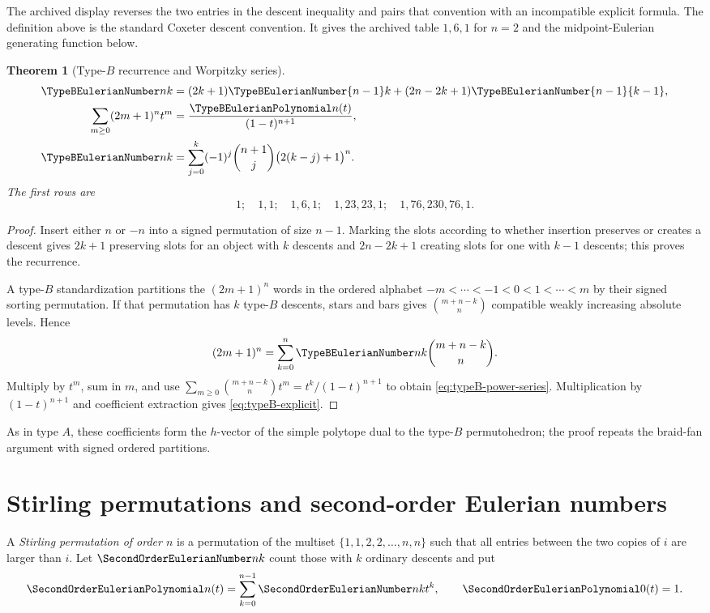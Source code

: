 \documentclass[11pt,a4paper,oneside,openany]{book}
\newtheorem{theorem}{Theorem}[chapter]
\theoremstyle{definition}
\theoremstyle{remark}
\begin{document}
\begin{auditbox}
The archived display reverses the two entries in the descent inequality and pairs
that convention with an incompatible explicit formula.  The definition above is
the standard Coxeter descent convention.  It gives the archived table
$1,6,1$ for $n=2$ and the midpoint-Eulerian generating function below.
\end{auditbox}

\begin{theorem}[Type-$B$ recurrence and Worpitzky series]\label{thm:typeB-eulerian}
\begin{align}
 \TypeBEulerianNumber nk&=(2k+1)\TypeBEulerianNumber{n-1}k+(2n-2k+1)\TypeBEulerianNumber{n-1}{k-1},
 \label{eq:typeB-recurrence}\\
 \sum_{m\ge0}(2m+1)^nt^m&=\frac{\TypeBEulerianPolynomial n(t)}{(1-t)^{n+1}},
 \label{eq:typeB-power-series}\\
 \TypeBEulerianNumber nk&=\sum_{j=0}^{k}(-1)^j\binom{n+1}{j}
             \bigl(2(k-j)+1\bigr)^n.
 \label{eq:typeB-explicit}
\end{align}
The first rows are
\[
1;\quad 1,1;\quad1,6,1;\quad1,23,23,1;\quad1,76,230,76,1.
\]
\end{theorem}
\begin{proof}
Insert either $n$ or $-n$ into a signed permutation of size $n-1$.  Marking the
slots according to whether insertion preserves or creates a descent gives
$2k+1$ preserving slots for an object with $k$ descents and
$2n-2k+1$ creating slots for one with $k-1$ descents; this proves the recurrence.

A type-$B$ standardization partitions the $(2m+1)^n$ words in the ordered alphabet
$-m<\cdots<-1<0<1<\cdots<m$ by their signed sorting permutation.  If that
permutation has $k$ type-$B$ descents, stars and bars gives
$\binom{m+n-k}{n}$ compatible weakly increasing absolute levels.  Hence
\[
 (2m+1)^n=\sum_{k=0}^{n}\TypeBEulerianNumber nk\binom{m+n-k}{n}.
\]
Multiply by $t^m$, sum in $m$, and use
$\sum_{m\ge0}\binom{m+n-k}{n}t^m=t^k/(1-t)^{n+1}$ to obtain
\eqref{eq:typeB-power-series}.  Multiplication by $(1-t)^{n+1}$ and coefficient
extraction gives \eqref{eq:typeB-explicit}.
\end{proof}

As in type $A$, these coefficients form the $h$-vector of the simple polytope dual
to the type-$B$ permutohedron; the proof repeats the braid-fan argument with signed
ordered partitions.

\section{Stirling permutations and second-order Eulerian numbers}
A \emph{Stirling permutation of order $n$} is a permutation of the multiset
$\{1,1,2,2,\ldots,n,n\}$ such that all entries between the two copies of $i$ are
larger than $i$.  Let $\SecondOrderEulerianNumber nk$ count those with $k$ ordinary descents and put
\[
 \SecondOrderEulerianPolynomial n(t)=\sum_{k=0}^{n-1}\SecondOrderEulerianNumber nk t^k,
 \qquad \SecondOrderEulerianPolynomial0(t)=1.
\]
\end{document}

